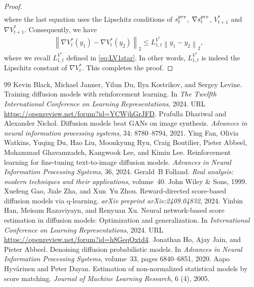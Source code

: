 \documentclass[10pt,a4paper]{amsart}
\newcommand{\norm}[1]{\left \|#1\right \|}
\begin{document}
\begin{proof}
\begin{align*}
\end{align*}
where the last equation uses the Lipschitz conditions of $s_t^{\rm pre}$, $\nabla s_t^{\rm pre}$, $V_{t+1}^*$ and $\nabla V_{t+1}^*$. Consequently, we have
\begin{align*}
    \norm{\nabla V_{t}^{*}(y_{1}) - \nabla V_{t}^{*}(y_{2})}_{2} \leq L_{1, t}^{V^*}\norm{y_1 - y_2}_2,
\end{align*}
where we recall $L_{1, t}^{V^*}$ defined in \eqref{eq:LV1star}. In other words, $L_{1, t}^{V^*}$ is indeed the Lipschitz constant of $\nabla V_t^*$. This completes the proof. 


\end{proof}

\begin{thebibliography}{99}
 Kevin Black, Michael Janner, Yilun Du, Ilya Kostrikov, and Sergey Levine. Training diffusion models with reinforcement learning. In \emph{The Twelfth International Conference on Learning Representations}, 2024. URL \url{https://openreview.net/forum?id=YCWjhGrJFD}.
 Prafulla Dhariwal and Alexander Nichol. {Diffusion models beat GANs on image synthesis}. \emph{Advances in neural information processing systems}, 34: 8780--8794, 2021.
 Ying Fan, Olivia Watkins, Yuqing Du, Hao Liu, Moonkyung Ryu, Craig Boutilier, Pieter Abbeel, Mohammad Ghavamzadeh, Kangwook Lee, and Kimin Lee. Reinforcement learning for fine-tuning text-to-image diffusion models. \emph{Advances in Neural Information Processing Systems}, 36, 2024.
 Gerald~B Folland. \emph{Real analysis: modern techniques and their applications}, volume~40. John Wiley \& Sons, 1999.
 Xuefeng Gao, Jiale Zha, and Xun~Yu Zhou. Reward-directed score-based diffusion models via q-learning. \emph{arXiv preprint arXiv:2409.04832}, 2024.
 Yinbin Han, Meisam Razaviyayn, and Renyuan Xu. Neural network-based score estimation in diffusion models: Optimization and generalization. In \emph{International Conference on Learning Representations}, 2024. URL \url{https://openreview.net/forum?id=h8GeqOxtd4}.
 Jonathan Ho, Ajay Jain, and Pieter Abbeel. Denoising diffusion probabilistic models. In \emph{Advances in Neural Information Processing Systems}, volume~33, pages 6840--6851, 2020.
 Aapo Hyv{\"a}rinen and Peter Dayan. Estimation of non-normalized statistical models by score matching. \emph{Journal of Machine Learning Research}, 6 (4), 2005.

\end{thebibliography}
\end{document}

